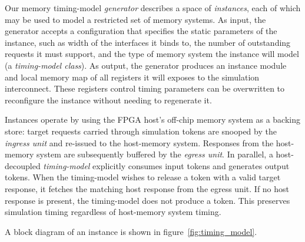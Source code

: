 
Our memory timing-model \textit{generator} describes a space of
\textit{instances}, each of which may be used to model a restricted set of
memory systems. As input, the generator accepts a configuration that specifies
the static parameters of the instance,  such as width of the interfaces it
binds to, the number of outstanding requests it must support, and the type of
memory system the instance will model (a \emph{timing-model class}). As output,
the generator produces an instance module and local memory map of all registers
it will exposes to the simulation interconnect. These registers control timing
parameters can be overwritten to reconfigure the instance without needing to
regenerate it.

Instances operate by using the FPGA host's off-chip memory system as a backing
store: target requests carried through simulation tokens are snooped by the
\emph{ingress unit} and re-issued to the host-memory system. Responses from the
host-memory system are subsequently buffered by the \emph{egress unit}. In
parallel, a host-decoupled \emph{timing-model} explicitly consumes input tokens
and generates output tokens. When the timing-model wishes to release a token
with a valid target response, it fetches the matching host response from the
egress unit. If no host response is present, the timing-model does not produce
a token. This preserves simulation timing regardless of host-memory system
timing.

A block diagram of an instance is shown in figure~\ref{fig:timing_model}.

